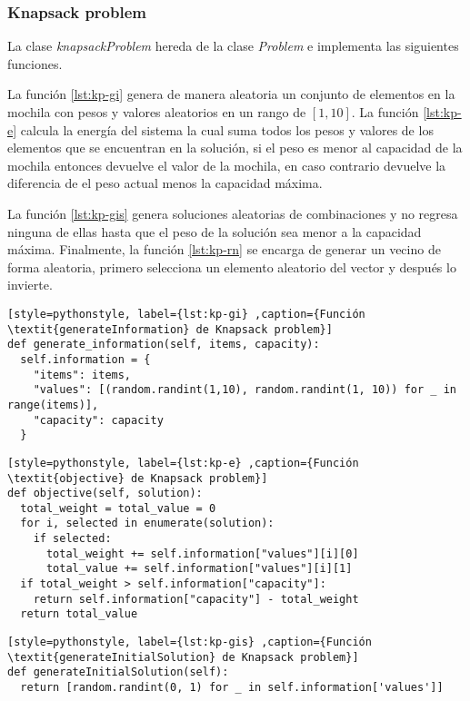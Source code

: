 \subsubsection{Knapsack problem}

La clase \textit{knapsackProblem} hereda de la clase \textit{Problem} e implementa las siguientes funciones.

La función \ref{lst:kp-gi} genera de manera aleatoria un conjunto de elementos en la mochila con pesos y valores aleatorios en un rango de $[1,10]$. La función \ref{lst:kp-e} calcula la energía del sistema la cual suma todos los pesos y valores de los elementos que se encuentran en la solución, si el peso es menor al capacidad de la mochila entonces devuelve el valor de la mochila, en caso contrario devuelve la diferencia de el peso actual menos la capacidad máxima.

La función \ref{lst:kp-gis} genera soluciones aleatorias de combinaciones y no regresa ninguna de ellas hasta que el peso de la solución sea menor a la capacidad máxima. Finalmente, la función \ref{lst:kp-rn} se encarga de generar un vecino de forma aleatoria, primero selecciona un elemento aleatorio del vector y después lo invierte.  

\begin{lstlisting}[style=pythonstyle, label={lst:kp-gi} ,caption={Función \textit{generateInformation} de Knapsack problem}]
def generate_information(self, items, capacity):
  self.information = {
	"items": items,
	"values": [(random.randint(1,10), random.randint(1, 10)) for _ in range(items)],
	"capacity": capacity
  }
\end{lstlisting}

\begin{lstlisting}[style=pythonstyle, label={lst:kp-e} ,caption={Función \textit{objective} de Knapsack problem}]
def objective(self, solution):
  total_weight = total_value = 0
  for i, selected in enumerate(solution):
    if selected:
      total_weight += self.information["values"][i][0]
  	  total_value += self.information["values"][i][1]
  if total_weight > self.information["capacity"]:
    return self.information["capacity"] - total_weight 
  return total_value
\end{lstlisting}

\begin{lstlisting}[style=pythonstyle, label={lst:kp-gis} ,caption={Función \textit{generateInitialSolution} de Knapsack problem}]
def generateInitialSolution(self):
  return [random.randint(0, 1) for _ in self.information['values']]
\end{lstlisting}

